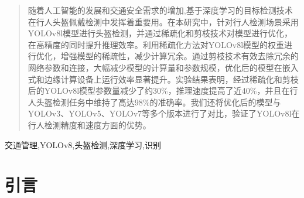 \documentclass[journal]{IEEEtran}
\begin{document}







\maketitle

\begin{abstract}
随着人工智能的发展和交通安全需求的增加,基于深度学习的目标检测技术在行人头盔佩戴检测中发挥着重要用。在本研究中，针对行人检测场景采用YOLOv8l模型进行头盔检测，并通过稀疏化和剪枝技术对模型进行优化，在高精度的同时提升推理效率。利用稀疏化方法对YOLOv8l模型的权重进行优化，增强模型的稀疏性，减少计算冗余。通过剪枝技术有效去除冗余的网络参数和连接，大幅减少模型的计算量和参数规模，优化后的模型在嵌入式和边缘计算设备上运行效率显著提升。实验结果表明，经过稀疏化和剪枝后的YOLOv8l模型参数量减少了约30\%，推理速度提高了近40\%，并且在行人头盔检测任务中维持了高达98\%的准确率。我们还将优化后的模型与YOLOv3、YOLOv5、YOLOv7等多个版本进行了对比，验证了YOLOv8l在行人检测精度和速度方面的优势。
\end{abstract}

\begin{IEEEkeywords}
交通管理,YOLOv8,头盔检测,深度学习,识别
\end{IEEEkeywords}

%
\IEEEpeerreviewmaketitle

\section{引言}
\end{document}
